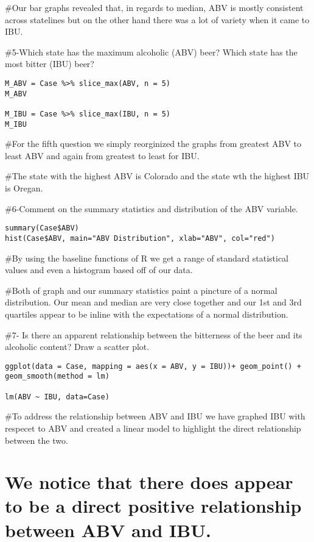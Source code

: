 \documentclass[
]{article}
\begin{document}
\#Our bar graphs revealed that, in regards to median, ABV is mostly
consistent across statelines but on the other hand there was a lot of
variety when it came to IBU.

\#5-Which state has the maximum alcoholic (ABV) beer? Which state has
the most bitter (IBU) beer?

\begin{verbatim}
M_ABV = Case %>% slice_max(ABV, n = 5)
M_ABV

M_IBU = Case %>% slice_max(IBU, n = 5)
M_IBU
\end{verbatim}

\#For the fifth question we simply reorginized the graphs from greatest
ABV to least ABV and again from greatest to least for IBU.

\#The state with the highest ABV is Colorado and the state wth the
highest IBU is Oregan.

\#6-Comment on the summary statistics and distribution of the ABV
variable.

\begin{verbatim}
summary(Case$ABV)
hist(Case$ABV, main="ABV Distribution", xlab="ABV", col="red")
\end{verbatim}

\#By using the baseline functions of R we get a range of standard
statistical values and even a histogram based off of our data.

\#Both of graph and our summary statistics paint a pincture of a normal
distribution. Our mean and median are very close together and our 1st
and 3rd quartiles appear to be inline with the expectations of a normal
distribution.

\#7- Is there an apparent relationship between the bitterness of the
beer and its alcoholic content? Draw a scatter plot.

\begin{verbatim}
ggplot(data = Case, mapping = aes(x = ABV, y = IBU))+ geom_point() + geom_smooth(method = lm) 

lm(ABV ~ IBU, data=Case)
\end{verbatim}

\#To address the relationship between ABV and IBU we have graphed IBU
with respecet to ABV and created a linear model to highlight the direct
relationship between the two.

\hypertarget{we-notice-that-there-does-appear-to-be-a-direct-positive-relationship-between-abv-and-ibu.}{%
\section{We notice that there does appear to be a direct positive
relationship between ABV and
IBU.}\label{we-notice-that-there-does-appear-to-be-a-direct-positive-relationship-between-abv-and-ibu.}}
\end{document}
